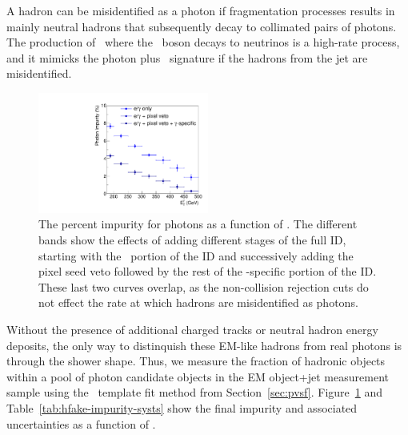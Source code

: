 A hadron can be misidentified as a photon if fragmentation processes results in mainly neutral hadrons that subsequently decay to collimated pairs of photons.
The production of \zj\ where the \PZ\ boson decays to neutrinos is a high-rate process, and it mimicks the photon plus \met\ signature if the hadrons from the jet are misidentified.

\begin{figure}[htbp]
  \centering
  \includegraphics[width=0.5\textwidth]{Analysis/Figures/hfake/plot_impurity_barrel_medium.pdf}
  \caption{
    The percent impurity for photons as a function of \pt. 
    The different bands show the effects of adding different stages of the full ID, starting with the \egamma\ portion of the ID and successively adding the pixel seed veto followed by the rest of the \Pgg-specific portion of the ID.
    These last two curves overlap, as the non-collision rejection cuts do not effect the rate at which hadrons are misidentified as photons.
  }
  \label{fig:impurity-compsb}
\end{figure}

Without the presence of additional charged tracks or neutral hadron energy deposits, the only way to distinquish these EM-like hadrons from real photons is through the shower shape. 
Thus, we measure the fraction of hadronic objects within a pool of photon candidate objects in the EM object+jet measurement sample using the \sieie\ template fit method from Section~\ref{sec:pvsf}.
Figure~\ref{fig:impurity-compsb} and Table~\ref{tab:hfake-impurity-systs} show the final impurity and associated uncertainties as a function of \pt. 

